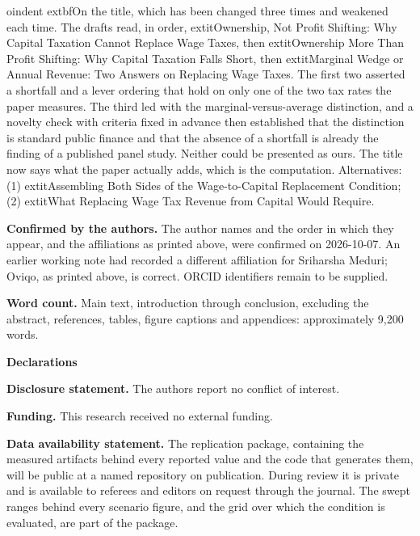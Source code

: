 \documentclass[11pt]{article}
\begin{document}
oindent	extbf{On the title, which has been changed three times and weakened each time.} The
drafts read, in order, 	extit{Ownership, Not Profit Shifting: Why Capital Taxation Cannot Replace
Wage Taxes}, then 	extit{Ownership More Than Profit Shifting: Why Capital Taxation Falls Short},
then 	extit{Marginal Wedge or Annual Revenue: Two Answers on Replacing Wage Taxes}. The first two
asserted a shortfall and a lever ordering that hold on only one of the two tax rates the paper
measures. The third led with the marginal-versus-average distinction, and a novelty check with
criteria fixed in advance then established that the distinction is standard public finance and
that the absence of a shortfall is already the finding of a published panel study. Neither could
be presented as ours. The title now says what the paper actually adds, which is the computation.
Alternatives: (1) 	extit{Assembling Both Sides of the Wage-to-Capital Replacement Condition};
(2) 	extit{What Replacing Wage Tax Revenue from Capital Would Require}.

\vspace{0.5em}

\noindent\textbf{Confirmed by the authors.} The author names and the order in which they appear,
and the affiliations as printed above, were confirmed on 2026-10-07. An earlier working note had
recorded a different affiliation for Sriharsha Meduri; Oviqo, as printed above, is correct.
ORCID identifiers remain to be supplied.

\vspace{1.5em}

\noindent\textbf{Word count.} Main text, introduction through conclusion, excluding the abstract,
references, tables, figure captions and appendices: approximately 9,200 words.

\vspace{1.5em}

\noindent\textbf{Declarations}

\vspace{0.5em}

\noindent\textbf{Disclosure statement.} The authors report no conflict of interest.

\vspace{0.5em}

\noindent\textbf{Funding.} This research received no external funding.

\vspace{0.5em}

\noindent\textbf{Data availability statement.} The replication package, containing the measured
artifacts behind every reported value and the code that generates them, will be public at a named
repository on publication. During review it is private and is available to referees and editors
on request through the journal. The swept ranges behind every scenario figure, and the grid over
which the condition is evaluated, are part of the package.
\end{document}
